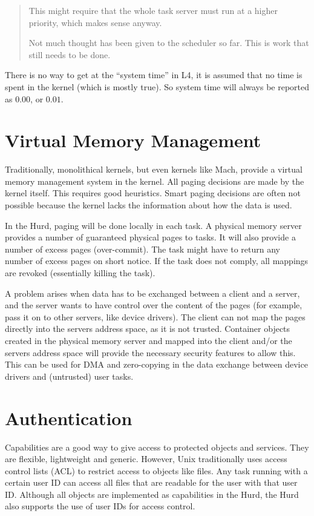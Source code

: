 \documentclass[9pt,a4paper]{extarticle}
\newenvironment{comment}{\footnotesize \begin{quote}}{\end{quote}}
\begin{document}
\begin{comment}
  This might require that the whole task server must run at a higher
  priority, which makes sense anyway.
  
  Not much thought has been given to the scheduler so far.  This is
  work that still needs to be done.
\end{comment}

There is no way to get at the ``system time'' in L4, it is assumed
that no time is spent in the kernel (which is mostly true).  So system
time will always be reported as $0.00$, or $0.01$.


\section{Virtual Memory Management}

Traditionally, monolithical kernels, but even kernels like Mach,
provide a virtual memory management system in the kernel.  All paging
decisions are made by the kernel itself.  This requires good
heuristics.  Smart paging decisions are often not possible because the
kernel lacks the information about how the data is used.

In the Hurd, paging will be done locally in each task.  A physical
memory server provides a number of guaranteed physical pages to tasks.
It will also provide a number of excess pages (over-commit).  The task
might have to return any number of excess pages on short notice.  If
the task does not comply, all mappings are revoked (essentially
killing the task).

A problem arises when data has to be exchanged between a client and a
server, and the server wants to have control over the content of the
pages (for example, pass it on to other servers, like device drivers).
The client can not map the pages directly into the servers address
space, as it is not trusted.  Container objects created in the
physical memory server and mapped into the client and/or the servers
address space will provide the necessary security features to allow
this.  This can be used for DMA and zero-copying in the data exchange
between device drivers and (untrusted) user tasks.


\section{Authentication}
\label{auth}

Capabilities are a good way to give access to protected objects and
services.  They are flexible, lightweight and generic.  However, Unix
traditionally uses access control lists (ACL) to restrict access to
objects like files.  Any task running with a certain user ID can
access all files that are readable for the user with that user ID.
Although all objects are implemented as capabilities in the Hurd, the
Hurd also supports the use of user IDs for access control.
\end{document}
